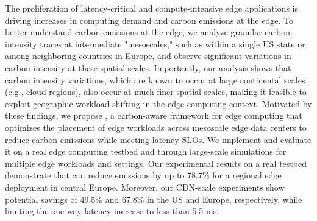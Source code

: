  



The proliferation of latency-critical and compute-intensive edge applications is driving increases in computing demand and carbon emissions at the edge. To better understand carbon emissions at the edge, we analyze granular carbon intensity traces at intermediate "mesoscales," such as within a single US state or among neighboring countries in Europe, and observe significant variations in carbon intensity at these spatial scales. Importantly, our analysis shows that carbon intensity variations, which are known to occur at large continental scales (e.g., cloud regions), also occur at much finer spatial scales, making it feasible to exploit geographic workload shifting in the edge computing context.
Motivated by these findings, we propose \proposedsystem, a carbon-aware framework for edge computing that optimizes the placement of edge workloads across mesoscale edge data centers to reduce carbon emissions while meeting latency SLOs. We implement \proposedsystem and evaluate it on a real edge computing testbed and through large-scale simulations for multiple edge workloads and settings. Our experimental results on a real testbed demonstrate that \proposedsystem can reduce emissions by up to 78.7\% for a regional edge deployment in central Europe. Moreover, our CDN-scale experiments show potential savings of 49.5\% and 67.8\% in the US and Europe, respectively, while limiting the one-way latency increase to less than 5.5 ms.

